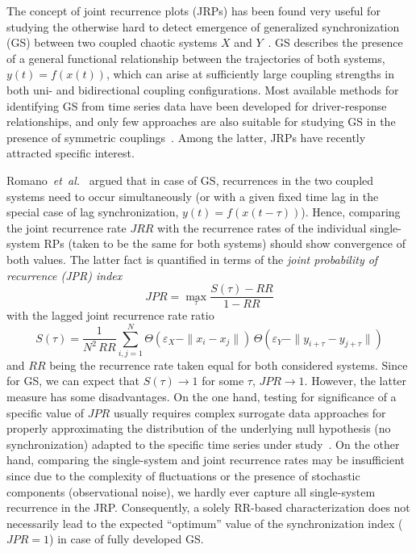 The concept of joint recurrence plots (JRPs) has been found very useful for studying the otherwise hard to detect emergence of generalized synchronization (GS) between two coupled chaotic systems $X$ and $Y$~\cite{Romano2005EPL}. GS describes the presence of a general functional relationship between the trajectories of both systems, $y(t)=f(x(t))$, which can arise at sufficiently large coupling strengths in both uni- and bidirectional coupling configurations. Most available methods for identifying GS from time series data have been developed for driver-response relationships, and only few approaches are also suitable for studying GS in the presence of symmetric couplings~\cite{Feldhoff2013}. Among the latter, JRPs have recently attracted specific interest.

Romano~\textit{et~al.}~\cite{Romano2005EPL} argued that in case of GS, recurrences in the two coupled systems need to occur simultaneously (or with a given fixed time lag in the special case of lag synchronization, $y(t)=f(x(t-\tau))$). Hence, comparing the joint recurrence rate $JRR$ with the recurrence rates of the individual single-system RPs (taken to be the same for both systems) should show convergence of both values. The latter fact is quantified in terms of the \textit{joint probability of recurrence (JPR) index}
\begin{equation}
JPR = \max_{\tau} \frac{S(\tau)-RR}{1-RR}
\label{eq:jpr}
\end{equation}
\noindent
with the lagged joint recurrence rate ratio
\begin{equation}
S(\tau)=\frac{1}{N^2\, RR}\sum_{i,j=1}^N \Theta(\varepsilon_X-\|x_i-x_j\|)\, \Theta(\varepsilon_Y-\|y_{i+\tau}-y_{j+\tau}\|)
\end{equation}
\noindent
and $RR$ being the recurrence rate taken equal for both considered systems. Since for GS, we can expect that $S(\tau)\to 1$ for some $\tau$, $JPR\to 1$. However, the latter measure has some disadvantages. On the one hand, testing for significance of a specific value of $JPR$ usually requires complex surrogate data approaches for properly approximating the distribution of the underlying null hypothesis (no synchronization) adapted to the specific time series under study~\cite{Thiel2006}. On the other hand, comparing the single-system and joint recurrence rates may be insufficient since due to the complexity of fluctuations or the presence of stochastic components (observational noise), we hardly ever capture all single-system recurrence in the JRP. Consequently, a solely RR-based characterization does not necessarily lead to the expected ``optimum'' value of the synchronization index ($JPR=1$) in case of fully developed GS.


